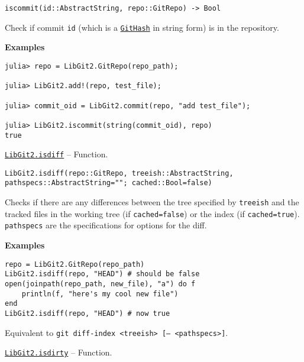\begin{adjustwidth}{2em}{0pt}


\begin{verbatim}
iscommit(id::AbstractString, repo::GitRepo) -> Bool
\end{verbatim}

Check if commit \texttt{id} (which is a \hyperlink{202290709580230708}{\texttt{GitHash}} in string form) is in the repository.

\textbf{Examples}


\begin{verbatim}
julia> repo = LibGit2.GitRepo(repo_path);

julia> LibGit2.add!(repo, test_file);

julia> commit_oid = LibGit2.commit(repo, "add test_file");

julia> LibGit2.iscommit(string(commit_oid), repo)
true
\end{verbatim}



\end{adjustwidth}
\hypertarget{3509758867865957563}{}
\hyperlink{3509758867865957563}{\texttt{LibGit2.isdiff}}  -- {Function.}

\begin{adjustwidth}{2em}{0pt}


\begin{verbatim}
LibGit2.isdiff(repo::GitRepo, treeish::AbstractString, pathspecs::AbstractString=""; cached::Bool=false)
\end{verbatim}

Checks if there are any differences between the tree specified by \texttt{treeish} and the tracked files in the working tree (if \texttt{cached=false}) or the index (if \texttt{cached=true}). \texttt{pathspecs} are the specifications for options for the diff.

\textbf{Examples}


\begin{verbatim}
repo = LibGit2.GitRepo(repo_path)
LibGit2.isdiff(repo, "HEAD") # should be false
open(joinpath(repo_path, new_file), "a") do f
    println(f, "here's my cool new file")
end
LibGit2.isdiff(repo, "HEAD") # now true
\end{verbatim}

Equivalent to \texttt{git diff-index <treeish> [-- <pathspecs>]}.



\end{adjustwidth}
\hypertarget{7941935372196782184}{}
\hyperlink{7941935372196782184}{\texttt{LibGit2.isdirty}}  -- {Function.}

